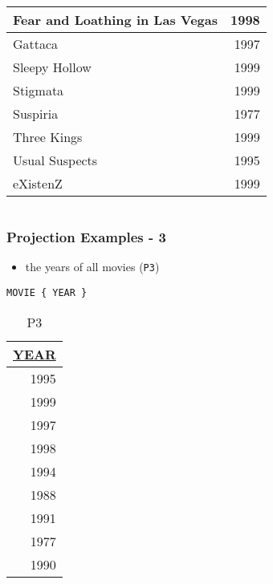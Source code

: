 \documentclass[dvipsnames]{beamer}
\theoremstyle{plain}
\begin{document}
\begin{frame}[fragile]
\begin{example}
\begin{columns}[b]
      \begin{tiny}
      \begin{table}
        \begin{tabular}{|l|r|}\hline
Fear and Loathing in Las Vegas & 1998\\\hline
Gattaca                        & 1997\\\hline
Sleepy Hollow                  & 1999\\\hline
Stigmata                       & 1999\\\hline
Suspiria                       & 1977\\\hline
Three Kings                    & 1999\\\hline
Usual Suspects                 & 1995\\\hline
eXistenZ                       & 1999\\\hline
        \end{tabular}
      \end{table}
      \end{tiny}
    \end{columns}
  \end{example}
\end{frame}

\begin{frame}[fragile]
  \frametitle{Projection Examples - 3}

  \begin{example}
    \begin{itemize}
      \item the years of all movies (\texttt{P3})
    \end{itemize}

    \begin{lstlisting}
MOVIE { YEAR }
    \end{lstlisting}

    \pause
    \vspace{-10pt}
    \begin{tiny}
    \begin{table}
      \caption{P3}
      \begin{tabular}{|r|}\hline
\underline{YEAR}\\[2pt]\hline\hline
            1995\\\hline
            1999\\\hline
            1997\\\hline
            1998\\\hline
            1994\\\hline
            1988\\\hline
            1991\\\hline
            1977\\\hline
            1990\\\hline
      \end{tabular}
    \end{table}
    \end{tiny}
  \end{example}
\end{frame}
\end{document}
